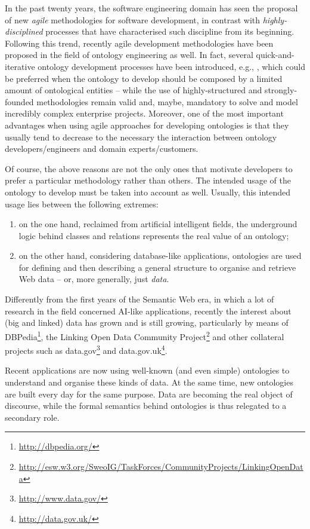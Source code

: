 \documentclass[runningheads,a4paper]{llncs}
\begin{document}
In the past twenty years, the software engineering domain has seen the proposal of new {\em agile} methodologies for software development, in contrast with {\em highly-disciplined} processes that have characterised such discipline from its beginning. Following this trend, recently agile development methodologies have been proposed in the field of ontology engineering as well. In fact, several quick-and-iterative ontology development processes have been introduced, e.g.,  \cite{__RefNumPara__5811_1461357291}, which could be preferred when the ontology to develop should be composed by a limited amount of ontological entities -- while the use of highly-structured and strongly-founded methodologies remain valid and, maybe, mandatory to solve and model incredibly complex enterprise projects. Moreover, one of the most important advantages when using agile approaches for developing ontologies is that they usually tend to decrease to the necessary the interaction between ontology developers/engineers and domain experts/customers.

Of course, the above reasons are not the only ones that motivate developers to prefer a particular methodology rather than others. The intended usage of the ontology to develop must be taken into account as well. Usually, this intended usage lies between the following extremes:
\begin{enumerate}
\item on the one hand, reclaimed from artificial intelligent fields, the underground logic behind classes and relations represents the real value of an ontology;
\item on the other hand, considering database-like applications, ontologies are used for defining and then describing a general structure to organise and retrieve Web data -- or, more generally, just {\em data}.
\end{enumerate}

Differently from the first years of the Semantic Web era, in which a lot of research in the field concerned AI-like applications, recently the interest about (big and linked) data has grown and is still growing, particularly by means of DBPedia\footnote{\url{http://dbpedia.org/}}, the Linking Open Data Community Project\footnote{\url{http://esw.w3.org/SweoIG/TaskForces/CommunityProjects/LinkingOpenData}} and other collateral projects such as data.gov\footnote{\url{http://www.data.gov/}} and data.gov.uk\footnote{\url{http://data.gov.uk/}}.

Recent applications are now using well-known (and even simple) ontologies to understand and organise these kinds of data. At the same time, new ontologies are built every day for the same purpose. Data are becoming the real object of discourse, while the formal semantics behind ontologies is thus relegated to a secondary role.
\end{document}
